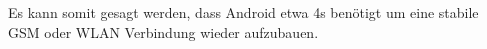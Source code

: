 Es kann somit gesagt werden, dass Android etwa 4s benötigt um eine stabile GSM oder WLAN Verbindung wieder aufzubauen.


